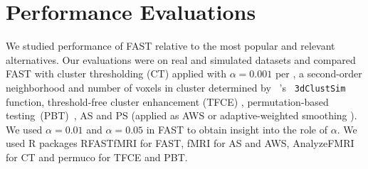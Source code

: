 \section{Performance Evaluations} \label{sec:simulation}
We studied performance of FAST relative to the most popular and
relevant alternatives. Our 
evaluations were on real and simulated datasets and compared FAST with
cluster thresholding (CT) applied with $\alpha = 0.001$ per
\citet{wooetal14}, a second-order
neighborhood and number of voxels in cluster determined by ~\citet{cox96}'s {\tt
  3dClustSim} function, 
threshold-free cluster enhancement (TFCE) \citep{smithandnichols09},
permutation-based 
testing~(PBT)~\citep{winkleretal14}, AS and PS (applied as AWS or
adaptive-weighted smoothing \citep{polzehl2006propagation}). We used
$\alpha=0.01$ and $\alpha=0.05$ in FAST to obtain insight 
into the role of $\alpha$. We
used R packages {\sc RFASTfMRI} for FAST, {\sc fMRI} for AS and AWS,
{\sc AnalyzeFMRI} for CT and  {\sc  permuco} for TFCE and PBT.


